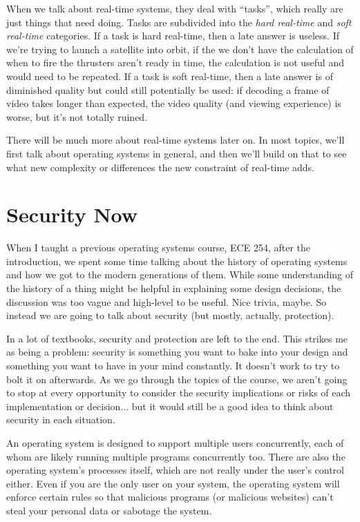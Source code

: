 When we talk about real-time systems, they deal with ``tasks'', which really are just things that need doing. Tasks are subdivided into the \textit{hard real-time} and \textit{soft real-time} categories. If a task is hard real-time, then a late answer is useless. If we're trying to launch a satellite into orbit, if the we don't have the calculation of when to fire the thrusters aren't ready in time, the calculation is not useful and would need to be repeated. If a task is soft real-time, then a late answer is of diminished quality but could still potentially be used: if decoding a frame of video takes longer than expected, the video quality (and viewing experience) is worse, but it's not totally ruined.

There will be much more about real-time systems later on. In most topics, we'll first talk about operating systems in general, and then we'll build on that to see what new complexity or differences the new constraint of real-time adds. 

\section*{Security Now}
When I taught a previous operating systems course, ECE 254, after the introduction, we spent some time talking about the history of operating systems and how we got to the modern generations of them. While some understanding of the history of a thing might be helpful in explaining some design decisions, the discussion was too vague and high-level to be useful. Nice trivia, maybe. So instead we are going to talk about security (but mostly, actually, protection).

In a lot of textbooks, security and protection are left to the end. This strikes me as being a problem: security is something you want to bake into your design and something you want to have in your mind constantly. It doesn't work to try to bolt it on afterwards. As we go through the topics of the course, we aren't going to stop at every opportunity to consider the security implications or risks of each implementation or decision... but it would still be a good idea to think about security in each situation.

An operating system is designed to support multiple users concurrently, each of whom are likely running multiple programs concurrently too. There are also the operating system's processes itself, which are not really under the user's control either. Even if you are the only user on your system, the operating system will enforce certain rules so that malicious programs (or malicious websites) can't steal your personal data or sabotage the system. 

